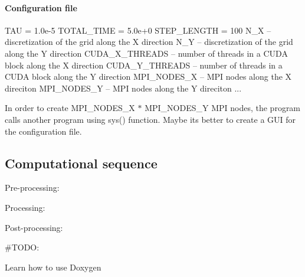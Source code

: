 \paragraph*{Configuration file}


\begin{DoxyCode}
TAU = 1.0e-5 %
TOTAL\_TIME = 5.0e+0 %
STEP\_LENGTH = 100 %
N\_X -- discretization of the grid along the X direction
N\_Y -- discretization of the grid along the Y direction
CUDA\_X\_THREADS -- number of threads in a CUDA block along the X direction
CUDA\_Y\_THREADS -- number of threads in a CUDA block along the Y direction
MPI\_NODES\_X -- MPI nodes along the X direciton
MPI\_NODES\_Y -- MPI nodes along the Y direciton
...
\end{DoxyCode}
 In order to create {\ttfamily M\+P\+I\+\_\+\+N\+O\+D\+E\+S\+\_\+X $\ast$ M\+P\+I\+\_\+\+N\+O\+D\+E\+S\+\_\+Y} M\+PI nodes, the program calls another program using {\ttfamily sys()} function. Maybe it\textquotesingle{}s better to create a G\+UI for the configuration file.

\subsection*{Computational sequence}


\begin{DoxyEnumerate}
\item Pre-\/processing\+:
\item Processing\+:
\item Post-\/processing\+:
\end{DoxyEnumerate}

\#\+T\+O\+DO\+:
\begin{DoxyItemize}
\item Learn how to use Doxygen 
\end{DoxyItemize}